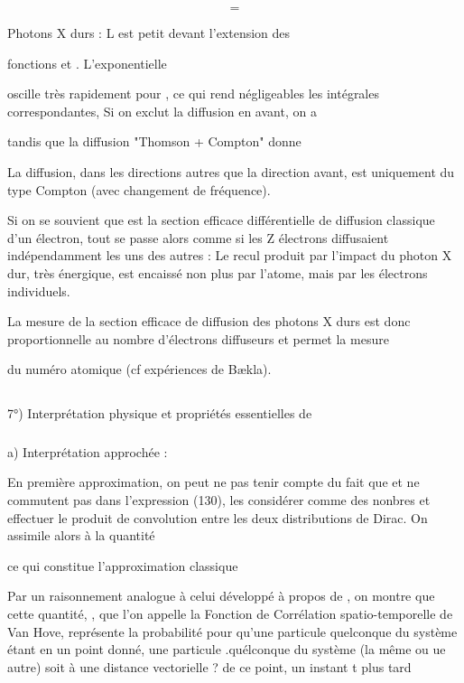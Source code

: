 \[
\tag{141}=
\]

 Photons X durs : L est petit devant l'extension des

fonctions  et . L'exponentielle 

oscille très rapidement
pour , ce qui rend négligeables les intégrales correspondantes, Si on
exclut la diffusion en avant, on a

tandis que la diffusion "Thomson + Compton" donne

La diffusion, dans les directions autres que la direction avant,
est uniquement du type Compton (avec changement de fréquence).

Si on se souvient que  est la section efficace
différentielle de diffusion classique d'un électron, tout se passe alors
comme si les Z électrons diffusaient indépendamment les uns des autres : Le
recul produit par l'impact du photon X dur, très énergique, est encaissé non
plus par l'atome, mais par les électrons individuels.

La mesure de la section efficace de diffusion des photons X durs
est donc proportionnelle au nombre d'électrons diffuseurs et permet la mesure

du numéro atomique (cf expériences de Bækla).
 

\subsection{}%
7°) Interprétation physique et propriétés essentielles de
\subsubsection{}%
a) Interprétation approchée :

En première approximation, on peut ne pas tenir compte du
fait que  et ne commutent pas dans l'expression (130), les
considérer comme des nonbres et effectuer le produit de convolution entre
les deux distributions de Dirac. On assimile alors  à la quantité

ce qui constitue l'approximation classique

Par un raisonnement analogue à celui développé à propos de
, on montre que cette quantité, , que l'on appelle la
Fonction de Corrélation spatio-temporelle de Van Hove, représente la probabilité
pour qu'une particule quelconque du système étant en un point donné,
une particule .quélconque du système (la même ou ue autre) soit à une distance
vectorielle ? de ce point, un instant t plus tard
